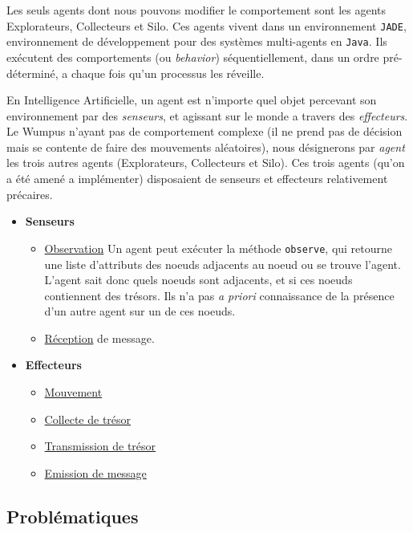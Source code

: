 \documentclass[a4paper, 10pt]{article}
\begin{document}
Les seuls agents dont nous pouvons modifier le comportement sont les agents Explorateurs, Collecteurs et Silo. Ces agents vivent dans un environnement \verb|JADE|, environnement de développement pour des systèmes multi-agents en \verb|Java|. Ils exécutent des comportements (ou \textit{behavior}) séquentiellement, dans un ordre pré-déterminé, a chaque fois qu'un processus les réveille.

En Intelligence Artificielle, un agent est n'importe quel objet percevant son environnement par des \textit{senseurs}, et agissant sur le monde a travers des \textit{effecteurs}.  Le Wumpus n'ayant pas de comportement complexe (il ne prend pas de décision mais se contente de faire des mouvements aléatoires), nous désignerons par \textit{agent} les trois autres agents (Explorateurs, Collecteurs et Silo). Ces trois agents (qu'on a été amené a implémenter) disposaient de senseurs et effecteurs relativement précaires.

\begin{itemize}
    \item \textbf{Senseurs}
        \begin{itemize}
            \item \underline{Observation} Un agent peut exécuter la méthode \verb|observe|, qui retourne une liste d'attributs des noeuds adjacents au noeud ou se trouve l'agent. L'agent sait donc quels noeuds sont adjacents, et si ces noeuds contiennent des trésors. Ils n'a pas \textit{a priori} connaissance de la présence d'un autre agent sur un de ces noeuds.
            \item \underline{Réception} de message.
        \end{itemize}
        
    
    \item \textbf{Effecteurs}
            \begin{itemize}
            \item \underline{Mouvement}
            \item \underline{Collecte de trésor}
            \item \underline{Transmission de trésor}
            \item \underline{Emission de message}
        \end{itemize}
\end{itemize}

\subsection{Problématiques}
\end{document}
